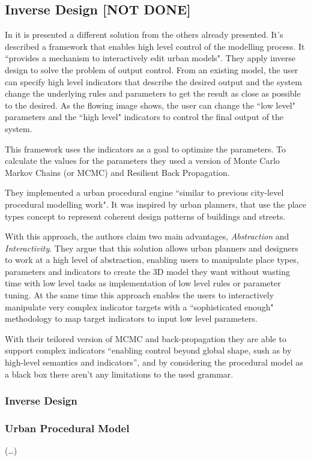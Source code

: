 
\subsection{Inverse Design [NOT DONE]} %
\label{sub:inverse_design}


In \cite{Vanegas2009} it is presented a different solution from the others already presented.
It's described a framework that enables high level control of the modelling process. It ``provides a mechanism to interactively edit urban models". They apply inverse design to solve the problem of output control. From an existing model, the user can specify high level indicators that describe the desired output and the system change the underlying rules and parameters to get the result as close as possible to the desired.
As the flowing image shows, the user can change the ``low level" parameters and the ``high level" indicators to control the final output of the system.


This framework uses the indicators as a goal to optimize the parameters. To calculate the values for the parameters they used a version of Monte Carlo Markov Chains (or MCMC) and Resilient Back Propagation.


They implemented a urban procedural engine ``similar to previous city-level procedural modelling work". It was inspired by urban planners, that use the place types concept to represent coherent design patterns of buildings and streets. 

With this approach, the authors claim two main advantages, \emph{Abstraction} and \emph{Interactivity}. They argue that this solution allows urban planners and designers to work at a high level of abstraction, enabling users to manipulate place types, parameters and indicators to create the 3D model they want without wasting time with low level tasks as implementation of low level rules or parameter tuning.
At the same time this approach enables the users to interactively manipulate very complex indicator targets with a ``sophisticated enough" methodology to map target indicators to input low level parameters.

With their teilored version of MCMC and back-propagation they are able to support complex indicators ``enabling control beyond global shape, sush as by high-level semantics and indicators'', and by considering the procedural model as a black box there aren't any limitations to the used grammar.

\subsubsection{Inverse Design} %
\label{ssub:inverse_design}





\subsubsection{Urban Procedural Model} %
\label{ssub:urban_procedural_model}





(\dots)

